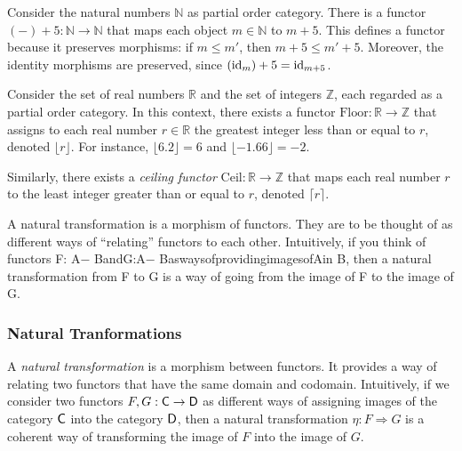 \begin{example}
  Consider the natural numbers $\mathbb{N}$ as partial order category. There is a functor $(-) + 5 : \mathbb{N} \to \mathbb{N}$
that maps each object $m \in \mathbb{N}$ to $m + 5$. This defines a functor because it preserves morphisms: if $m \leq m'$, then $m + 5 \leq m' + 5$. Moreover, the identity morphisms are preserved, since $(\mathrm{id}_m) + 5 = \mathrm{id}_{m+5}$.
\end{example}

\begin{example}
  Consider the set of real numbers $\mathbb{R}$ and the set of integers $\mathbb{Z}$, each regarded as a partial order category. In this context, there exists a functor $\mathrm{Floor} : \mathbb{R} \to \mathbb{Z} $ that assigns to each real number $r \in \mathbb{R}$ the greatest integer less than or equal to $r$, denoted $\lfloor r \rfloor$. For instance, $\lfloor 6.2 \rfloor = 6$ and $\lfloor -1.66 \rfloor = -2$. 

Similarly, there exists a \emph{ceiling functor} $\mathrm{Ceil} : \mathbb{R} \to \mathbb{Z}$ that maps each real number $r$ to the least integer greater than or equal to $r$, denoted $\lceil r \rceil$.

A natural transformation is a morphism of functors. They are to be thought of as different ways of “relating” functors to each other. Intuitively, if you think of functors
 F: A− BandG:A− BaswaysofprovidingimagesofAin
 B, then a natural transformation from F to G is a way of going from
 the image of F to the image of G. 
\end{example}




\subsubsection{Natural Tranformations}
A \emph{natural transformation} is a morphism between functors. It provides a way of relating two functors that have the same domain and codomain. Intuitively, if we consider two functors $F, G : \mathsf{C} \to \mathsf{D}$ as different ways of assigning images of the category $\mathsf{C}$ into the category $\mathsf{D}$, then a natural transformation $\eta : F \Rightarrow G$ is a coherent way of transforming the image of $F$ into the image of $G$.

